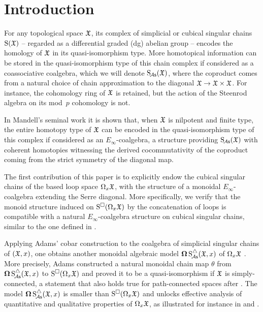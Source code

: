 
\section{Introduction}

For any topological space $\mathfrak{X}$, its complex of simplicial or cubical singular chains $\operatorname{S}(\mathfrak{X})$ -- regarded as a differential graded (dg) abelian group -- encodes the homology of $\mathfrak{X}$ in its quasi-isomorphism type.
More homotopical information can be stored in the quasi-isomorphism type of this chain complex if considered as a coassociative coalgebra, which we will denote $\operatorname{S_{\!{\mathcal{A}\mathsf{s}}}}(\mathfrak{X})$, where the coproduct comes from a natural choice of chain approximation to the diagonal $\mathfrak{X} \to \mathfrak{X} \times \mathfrak{X}$.
For instance, the cohomology ring of $\mathfrak{X}$ is retained, but the action of the Steenrod algebra on its mod~$p$ cohomology is not.

In Mandell's seminal work \cite{mandell2006homotopy_type} it is shown that, when $\mathfrak{X}$ is nilpotent and finite type, the entire homotopy type of $\mathfrak{X}$ can be encoded in the quasi-isomorphism type of this complex if considered as an $E_\infty$-coalgebra, a structure providing $\operatorname{S_{\!{\mathcal{A}\mathsf{s}}}}(\mathfrak{X})$ with coherent homotopies witnessing the derived cocommutativity of the coproduct coming from the strict symmetry of the diagonal map.

The first contribution of this paper is to explicitly endow the cubical singular chains of the based loop space $\Omega_x \mathfrak{X}$, with the structure of a monoidal $E_\infty$-coalgebra extending the Serre diagonal.
More specifically, we verify that the monoid structure induced on $\operatorname{S^{\square}}(\Omega_x \mathfrak{X})$ by the concatenation of loops is compatible with a natural $E_\infty$-coalgebra structure on cubical singular chains, similar to the one defined in \cite{medina2022cube_einfty}.

Applying Adams' cobar construction to the coalgebra of simplicial singular chains of $(\mathfrak{X}, x)$, one obtains another monoidal algebraic model $\operatorname{\mathbf{\Omega}} \operatorname{S^{\triangle}_{\!{\mathcal{A}\mathsf{s}}}}(\mathfrak{X}, x)$ of $\Omega_x \mathfrak{X}$ \cite{adams1956cobar}.
More precisely, Adams constructed a natural monoidal chain map $\theta$ from $\operatorname{\mathbf{\Omega}} \operatorname{S^{\triangle}_{\!{\mathcal{A}\mathsf{s}}}}(\mathfrak{X}, x)$ to $\operatorname{S^{\square}}(\Omega_x \mathfrak{X})$ and proved it to be a quasi-isomorphism if $\mathfrak{X}$ is simply-connected, a statement that also holds true for path-connected spaces after \cite{rivera2018cubical}.
The model $\operatorname{\mathbf{\Omega}} \operatorname{S^{\triangle}_{\!{\mathcal{A}\mathsf{s}}}}(\mathfrak{X}, x)$ is smaller than $\operatorname{S^{\square}}(\Omega_x \mathfrak{X})$ and unlocks effective analysis of quantitative and qualitative properties of $\Omega_x \mathfrak{X}$, as illustrated for instance in \cite{chainalgebraloops} and \cite{adamscobarequivalence}.

